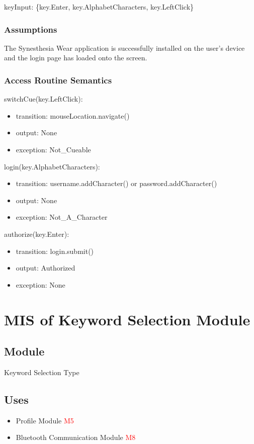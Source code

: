 \documentclass[12pt, titlepage]{article}
\begin{document}
keyInput: \{key.Enter, key.AlphabetCharacters, key.LeftClick\}

\subsubsection{Assumptions}

The Synesthesia Wear application is successfully installed on the user's device and the login page has loaded onto the screen. 

\subsubsection{Access Routine Semantics}

\noindent switchCue(key.LeftClick):
\begin{itemize}
\item transition: mouseLocation.navigate() 
\item output: None
\item exception: Not\_Cueable 
\end{itemize}

\noindent login(key.AlphabetCharacters):
\begin{itemize}
\item transition: username.addCharacter() or password.addCharacter()
\item output: None
\item exception: Not\_A\_Character 
\end{itemize}


\noindent authorize(key.Enter):
\begin{itemize}
\item transition: login.submit() 
\item output: Authorized
\item exception: None 
\end{itemize}

\newpage 

\section{MIS of Keyword Selection Module} \label{Keyword Selection Module}
\subsection{Module}
Keyword Selection Type

\subsection{Uses}
\begin{itemize}
  \item Profile Module \textcolor{red}{M5}
  \item Bluetooth Communication Module \textcolor{red}{M8}
  \end{itemize}
\end{document}
